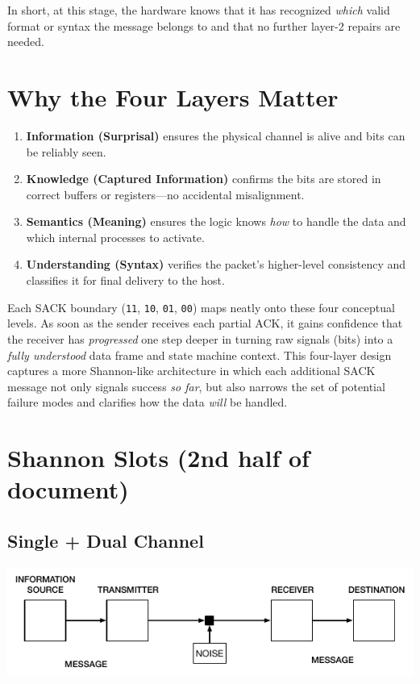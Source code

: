 \documentclass[../HFT-main.tex]{subfiles}
\begin{document}
\vspace{6pt}

\noindent
In short, at this stage, the hardware knows that it has recognized \emph{which} valid format or syntax the message belongs to and that no further layer-2 repairs are needed.

\section*{Why the Four Layers Matter}

\begin{enumerate}
\item \textbf{Information (Surprisal)} ensures the physical channel is alive and bits can be reliably seen.
\item \textbf{Knowledge (Captured Information)} confirms the bits are stored in correct buffers or registers---no accidental misalignment.
\item \textbf{Semantics (Meaning)} ensures the logic knows \emph{how} to handle the data and which internal processes to activate.
\item \textbf{Understanding (Syntax)} verifies the packet’s higher-level consistency and classifies it for final delivery to the host.

\end{enumerate}

Each SACK boundary (\texttt{11}, \texttt{10}, \texttt{01}, \texttt{00}) maps neatly onto these four conceptual levels. As soon as the sender receives each partial ACK, it gains confidence that the receiver has \emph{progressed} one step deeper in turning raw signals (bits) into a \emph{fully understood} data frame and state machine context. This four-layer design captures a more Shannon-like architecture in which each additional SACK message not only signals success \emph{so far}, but also narrows the set of potential failure modes and clarifies how the data \emph{will} be handled.



\section{Shannon Slots (2nd half of document)}

\subsection{Single + Dual Channel}
\begin{marginfigure}
  \centering
  \includegraphics[width=1.2\linewidth]{../figures/One-Way-Shannon-LR.pdf}

\end{marginfigure}
\end{document}
